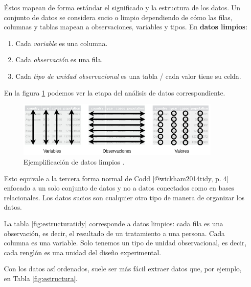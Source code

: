 \documentclass[]{article}
\providecommand{\tightlist}{%
  \setlength{\itemsep}{0pt}\setlength{\parskip}{0pt}}
\begin{document}
Éstos mapean de forma estándar el significado y la estructura de los
datos. Un conjunto de datos se considera sucio o limpio dependiendo de
cómo las filas, columnas y tablas mapean a observaciones, variables y
tipos. En \textbf{datos limpios}:

\begin{enumerate}
\def\labelenumi{\arabic{enumi}.}
\tightlist
\item
  Cada \emph{variable} es una columna.
\item
  Cada \emph{observación} es una fila.
\item
  Cada \emph{tipo de unidad observacional} es una tabla / cada valor
  tiene su celda.
\end{enumerate}

En la figura \ref{fig:datoslimpios} podemos ver la etapa del análisis de
datos correspondiente.

\begin{figure}[h]
    \centering
    \includegraphics[width=0.9\textwidth]{../img/datos_limpios.png}
    \caption{Ejemplificación de datos limpios \parencite[][, sección Data Tidying]{wickham2016r}.}
    \label{fig:datoslimpios}
\end{figure}

Esto equivale a la tercera forma normal de Codd {[}@wickham2014tidy, p.
4{]} enfocado a un solo conjunto de datos y no a datos conectados como
en bases relacionales. Los datos sucios son cualquier otro tipo de
manera de organizar los datos.

La tabla \ref{fig:estructuratidy} corresponde a datos limpios: cada fila
es una observación, es decir, el resultado de un tratamiento a una
persona. Cada columna es una variable. Solo tenemos un tipo de unidad
observacional, es decir, cada renglón es una unidad del diseño
experimental.

Con los datos así ordenados, suele ser más fácil extraer datos que, por
ejemplo, en Tabla \ref{fig:estructura}.

\renewcommand\bcStyleTitre[1]{\large\textcolor{bbblack}{#1}}
\end{document}
